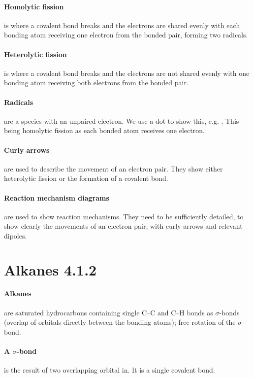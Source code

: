 \documentclass[11pt,a4paper]{memoir}
\begin{document}
	\paragraph{Homolytic fission} is where a covalent bond breaks and the electrons are shared evenly with each bonding 
atom receiving one electron from the bonded pair, forming two radicals.

	\paragraph{Heterolytic fission} is where a covalent bond breaks and the electrons are not shared evenly with one bonding atom receiving both electrons from the bonded pair.
	
	\paragraph{Radicals} are a species with an unpaired electron. We use a dot to show this, e.g. . This being homolytic fission as each bonded atom receives one electron.
	
	\paragraph{Curly arrows} are used to describe the movement of an electron pair. They show either heterolytic fission or the formation of a covalent bond.
	
	\paragraph{Reaction mechanism diagrams} are used to show reaction mechanisms. They need to be sufficiently detailed, to show clearly the movements of an electron pair, with curly arrows and relevant dipoles.
	
\section{Alkanes 4.1.2}
	
	\paragraph{Alkanes} are saturated hydrocarbons containing single C–C and C–H bonds as $\sigma$-bonds (overlap of orbitals directly between the bonding atoms); free rotation of the $\sigma$-bond.
	
	\paragraph{A $\sigma$-bond} is the result of two overlapping orbital in. It is a single covalent bond.
	
\end{document}
